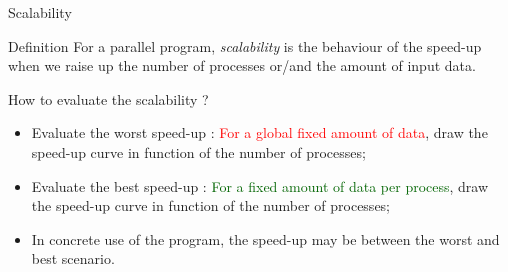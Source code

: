 \documentclass[compress,10pt,aspectratio=169]{beamer}
\begin{document}
\begin{frame}[fragile]{Scalability}
    \begin{block}{Definition}
        For a parallel program, \emph{scalability} is the behaviour of the speed-up when we raise up the number of processes or/and the amount 
        of input data. 
    \end{block}

    \begin{exampleblock}{How to evaluate the scalability ?}
        \begin{itemize}
            \item Evaluate the worst speed-up : \textcolor{red}{For a global fixed amount of data}, draw the speed-up curve in function of the number of processes;
            \item Evaluate the best speed-up : \textcolor{DarkGreen}{For a fixed amount of data per process}, draw the speed-up curve in function of the number of processes;
            \item In concrete use of the program, the speed-up may be between the worst and best scenario.
        \end{itemize}
    \end{exampleblock}
\end{frame}
\end{document}
